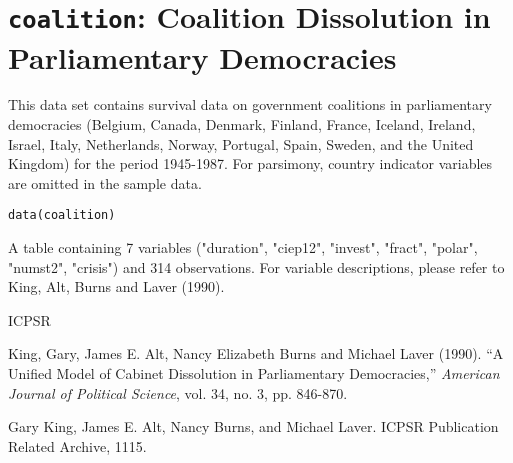  \section{{\tt coalition}: Coalition Dissolution in Parliamentary Democracies}\label{ss:coalition}
\begin{Description}\relax
This data set contains survival data on government coalitions in
parliamentary democracies (Belgium, Canada, Denmark, Finland, France,
Iceland, Ireland, Israel, Italy, Netherlands, Norway, Portugal, Spain,
Sweden, and the United Kingdom) for the period 1945-1987.  For
parsimony, country indicator variables are omitted in the sample data.
\end{Description}
\begin{Usage}
\begin{verbatim}data(coalition)\end{verbatim}
\end{Usage}
\begin{Format}\relax
A table containing 7 variables ("duration", "ciep12", "invest",
"fract", "polar", "numst2", "crisis") and 314 observations.  For
variable descriptions, please refer to King, Alt, Burns and Laver
(1990).
\end{Format}
\begin{Source}\relax
ICPSR
\end{Source}
\begin{References}\relax
King, Gary, James E. Alt, Nancy Elizabeth Burns and Michael Laver (1990).
``A Unified Model  of Cabinet Dissolution in Parliamentary
Democracies,'' \emph{American Journal of Political Science}, vol. 34,
no. 3, pp. 846-870.  

Gary King, James E. Alt, Nancy Burns, and Michael Laver.  ICPSR
Publication Related Archive, 1115.
\end{References}


